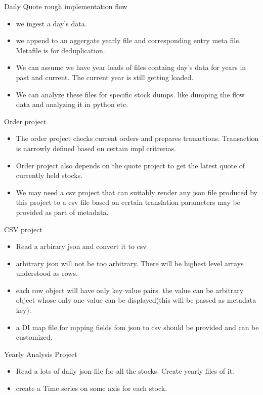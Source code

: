 \documentclass{beamer}
\begin{document}
\begin{frame}{Daily Quote rough implementation flow}
	\begin{itemize}
		\item we ingest a day's data.
		\item we append to an aggergate yearly file and corresponding entry meta file. Metafile is for deduplication.
		\item We can assume we have year loads of files containg day's data for years in past and current. The current year is still getting loaded.

		\item We can analyze these files for specific stock dumps. like dumping the flow data and analyzing it in python etc.
	\end{itemize}
\end{frame}


\begin{frame}{Order project}
	\begin{itemize}
		\item The order project checks current orders and prepares tranactions. Transaction is narrowly defined based on certain impl critrerias.
		\item Order project also depends on the quote project to get the latest quote of currently held stocks.
		\item We may need a csv project that can suitably render any json file produced by this project to a csv file based on  certain translation parameters may be provided as part of metadata.
		
	\end{itemize}
\end{frame}

\begin{frame}{CSV project}
	\begin{itemize}
		\item Read a arbirary json and convert it to csv
		\item arbitrary json will not be too arbitrary. There will be highest level arrays understood as rows.
		\item each row object will have only key value pairs. the value can be arbitrary object whose only one value can be displayed(this will be passed as metadata key).
		\item a DI map file for mpping fields fom json to csv should be provided and can be customized.
	\end{itemize}
\end{frame}

\begin{frame}{Yearly Analysis Project}
	\begin{itemize}
		\item Read a lots of  daily json file for all the stocks. Create yearly files of it.
		\item create a Time series  on some axis for each stock.
	\end{itemize}
\end{frame}
\end{document}
